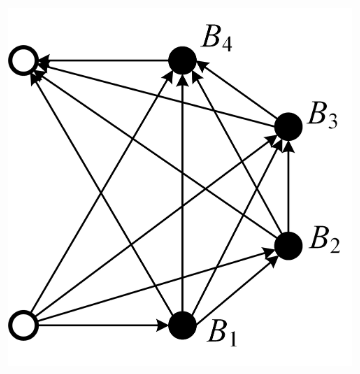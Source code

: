 \documentclass{article}
\begin{document}
\begin{figure}[htbp]
    \centering
    \begin{subfigure}[b]{0.31\textwidth}
        \includegraphics[width=\textwidth]{../attachments/direct-graph-he.png}
        \caption{}
        \label{fig:direct-graph-he}
    \end{subfigure}
    \hspace{0.02\textwidth}
    \begin{subfigure}[b]{0.23\textwidth}

\end{subfigure}
\end{figure}
\end{document}
